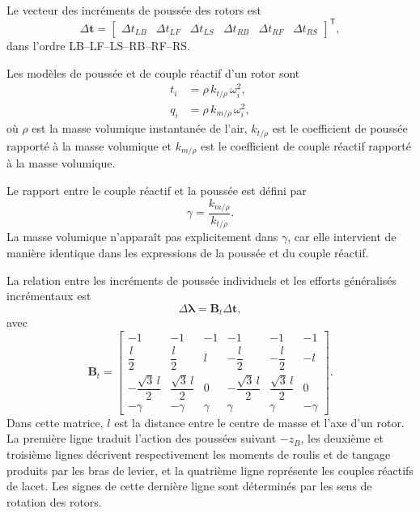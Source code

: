 \documentclass[11pt,a4paper,oneside]{report}
\newcommand{\vect}[1]{\bm{#1}}
\newcommand{\trans}{^{\mathsf T}}
\begin{document}
Le vecteur des incréments de poussée des rotors est
\begin{equation}
	\Delta\vect t
	=
	\begin{bmatrix}
		\Delta t_{LB} &
		\Delta t_{LF} &
		\Delta t_{LS} &
		\Delta t_{RB} &
		\Delta t_{RF} &
		\Delta t_{RS}
	\end{bmatrix}\trans,
	\label{eq_incremental_rotor_thrust_vector}
\end{equation}
dans l'ordre LB--LF--LS--RB--RF--RS.

Les modèles de poussée et de couple réactif d'un rotor sont
\begin{subequations}
	\label{eq_rotor_thrust_torque_density}
	\begin{align}
		t_i
		&=
		\rho\,k_{t/\rho}\,\omega_i^2,
		\\
		q_i
		&=
		\rho\,k_{m/\rho}\,\omega_i^2,
	\end{align}
\end{subequations}
où $\rho$ est la masse volumique instantanée de l'air, $k_{t/\rho}$ est le coefficient de poussée rapporté à la masse volumique et $k_{m/\rho}$ est le coefficient de couple réactif rapporté à la masse volumique.

Le rapport entre le couple réactif et la poussée est défini par
\begin{equation}
	\gamma
	=
	\frac{k_{m/\rho}}{k_{t/\rho}}.
	\label{eq_reaction_torque_thrust_ratio}
\end{equation}
La masse volumique n'apparaît pas explicitement dans $\gamma$, car elle intervient de manière identique dans les expressions de la poussée et du couple réactif.

La relation entre les incréments de poussée individuels et les efforts généralisés incrémentaux est
\begin{equation}
	\Delta\vect\lambda
	=
	\mathbf B_t\Delta\vect t,
	\label{eq_incremental_thrust_allocation}
\end{equation}
avec
\begin{equation}
	\mathbf B_t
	=
	\begin{bmatrix}
		-1 &
		-1 &
		-1 &
		-1 &
		-1 &
		-1
		\\[1mm]
		\dfrac{l}{2} &
		\dfrac{l}{2} &
		l &
		-\dfrac{l}{2} &
		-\dfrac{l}{2} &
		-l
		\\[2mm]
		-\dfrac{\sqrt{3}\,l}{2} &
		\dfrac{\sqrt{3}\,l}{2} &
		0 &
		-\dfrac{\sqrt{3}\,l}{2} &
		\dfrac{\sqrt{3}\,l}{2} &
		0
		\\[2mm]
		-\gamma &
		-\gamma &
		\gamma &
		\gamma &
		\gamma &
		-\gamma
	\end{bmatrix}.
	\label{eq_thrust_allocation_matrix}
\end{equation}
Dans cette matrice, $l$ est la distance entre le centre de masse et l'axe d'un rotor. La première ligne traduit l'action des poussées suivant $-z_B$, les deuxième et troisième lignes décrivent respectivement les moments de roulis et de tangage produits par les bras de levier, et la quatrième ligne représente les couples réactifs de lacet. Les signes de cette dernière ligne sont déterminés par les sens de rotation des rotors.
\end{document}
